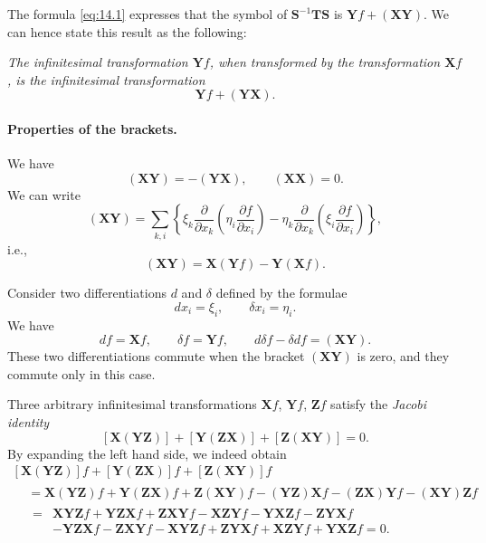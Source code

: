 \documentclass[leqno,11pt]{book}
\numberwithin{equation}{chapter}
\newcommand{\pd}{\partial}
\theoremstyle{shape1}
\theoremstyle{shapesmall}
\newcommand{\somespace}{\vspace{9pt}}
\begin{document}
\somespace

The formula \eqref{eq:14.1} expresses that the symbol of $\mathbf{S}^{-1}\mathbf{TS}$ is $\mathbf{Y}f+(\mathbf{XY})$. We can hence state this result as the following:

\somespace

\emph{The infinitesimal transformation $\mathbf{Y}f$, when transformed by the transformation $\mathbf{X}f$, is the infinitesimal transformation}
\begin{equation}
  \label{eq:14.3}
  \mathbf{Y}f+(\mathbf{YX}).
\end{equation}

\paragraph{Properties of the brackets.}
\label{sec:206}
We have
\begin{equation}
  \label{eq:14.4}
  (\mathbf{XY})=-(\mathbf{YX}),\qquad(\mathbf{XX})=0.
\end{equation}
We can write
\[
(\mathbf{XY})=\sum_{k,i}\left\{\xi_{k}\frac{\pd}{\pd x_{k}}\left(\eta_{i}\frac{\pd f}{\pd x_{i}}\right)-\eta_{k}\frac{\pd}{\pd x_{k}}\left(\xi_{i}\frac{\pd f}{\pd x_{i}}\right)\right\},
\]
i.e.,
\begin{equation}
  \label{eq:14.5}
  (\mathbf{XY})=\mathbf{X}(\mathbf{Y}f)-\mathbf{Y}(\mathbf{X}f).
\end{equation}

Consider two differentiations $d$ and $\delta$ defined by the formulae
\[
dx_{i}=\xi_{i},\qquad \delta x_{i}=\eta_{i}.
\]
We have
\[
df=\mathbf{X}f,\qquad\delta f=\mathbf{Y}f,\qquad d\delta f-\delta df=(\mathbf{XY}).
\]
These two differentiations commute when the bracket $(\mathbf{XY})$ is zero, and they commute only in this case.

Three arbitrary infinitesimal transformations $\mathbf{X}f$, $\mathbf{Y}f$, $\mathbf{Z}f$ satisfy the \emph{Jacobi identity}
\begin{equation}
  \label{eq:14.6}
  [\mathbf{X}(\mathbf{YZ})]+
  [\mathbf{Y}(\mathbf{ZX})]+
  [\mathbf{Z}(\mathbf{XY})]=0.
\end{equation}
By expanding the left hand side, we indeed obtain
\[
\begin{multlined}
  [\mathbf{X}(\mathbf{YZ})]f+[\mathbf{Y}(\mathbf{ZX})]f+[\mathbf{Z}(\mathbf{XY})]f\\
  \begin{aligned}
    &=\mathbf{X}(\mathbf{YZ})f+\mathbf{Y}(\mathbf{ZX})f+\mathbf{Z}(\mathbf{XY})f-
    (\mathbf{YZ})\mathbf{X}f-(\mathbf{ZX})\mathbf{Y}f-(\mathbf{XY})\mathbf{Z}f\\&
    \begin{aligned}
      {}={}&\mathbf{XYZ}f+\mathbf{YZX}f+\mathbf{ZXY}f-\mathbf{XZY}f-\mathbf{YXZ}f-\mathbf{ZYX}f\\
      &-\mathbf{YZX}f-\mathbf{ZXY}f-\mathbf{XYZ}f+\mathbf{ZYX}f+\mathbf{XZY}f+\mathbf{YXZ}f=0.
    \end{aligned}
  \end{aligned}
\end{multlined}
\]
\end{document}
